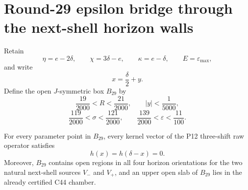 \section{Round-29 epsilon bridge through the next-shell horizon walls}
\label{sec:p12-round29-epsilon-bridge}

Retain
\[
\eta=e-2\delta,\qquad
\chi=3\delta-e,\qquad
\kappa=e-\delta,
\qquad E=\varepsilon_{\max},
\]
and write
\[
x=\frac\delta2+y.
\]
Define the open \(J\)-symmetric box \(B_{29}\) by
\[
\frac{19}{2000}<R<\frac{21}{2000},
\qquad
|y|<\frac1{5000},
\]
\[
\frac{119}{2000}<\sigma<\frac{121}{2000},
\qquad
\frac{139}{2000}<\varepsilon<\frac{11}{100}.
\]

\begin{theorem}
\label{thm:p12-round29-epsilon-bridge}
For every parameter point in \(B_{29}\), every kernel vector of the P12
three-shift raw operator satisfies
\[
\boxed{h(x)=h(\delta-x)=0}.
\]
Moreover, \(B_{29}\) contains open regions in all four horizon orientations
for the two natural next-shell sources \(V_-\) and \(V_+\), and an upper
open slab of \(B_{29}\) lies in the already certified C44 chamber.
\end{theorem}

